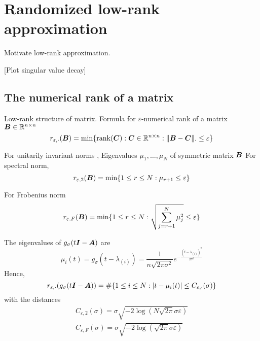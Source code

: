 \chapter{Randomized low-rank approximation}
\label{chp:3-nystrom}

Motivate low-rank approximation.

[Plot singular value decay]


\section{The numerical rank of a matrix}
\label{sec:3-nystrom-numerical-rank}

Low-rank structure of matrix.
Formula for $\varepsilon$-numerical rank \cite[Definition~1.1]{noga2013rank} of a matrix $\boldsymbol{B} \in \mathbb{R}^{n \times n}$
\begin{equation}
    r_{\varepsilon, \cdot}(\boldsymbol{B}) = \min \{\operatorname{rank}(\boldsymbol{C}): \boldsymbol{C} \in \mathbb{R}^{n \times n}: \lVert \boldsymbol{B} - \boldsymbol{C} \rVert _{\cdot} \leq \varepsilon \}
    \label{equ:3-nystrom-SS-def-numerical-low-rank}
\end{equation}

For unitarily invariant norms \cite[Theorem~5]{mirsky1960truncation},
Eigenvalues $\mu_1, \dots, \mu_N$ of symmetric matrix $\boldsymbol{B}$
For spectral norm,
\begin{equation}
    r_{\varepsilon, 2}(\boldsymbol{B}) = \min \{1 \leq r \leq N: \mu_{r+1} \leq \varepsilon \}
    \label{equ:3-nystrom-SS-def-numerical-low-rank-spectral-norm}
\end{equation}

For Frobenius norm
\begin{equation}
    r_{\varepsilon, F}(\boldsymbol{B}) = \min \{1 \leq r \leq N: \sqrt{\sum_{j=r+1}^N \mu_{j}^2} \leq \varepsilon \}
    \label{equ:3-nystrom-SS-def-numerical-low-rank-frobenius-norm}
\end{equation}

The eigenvalues of $g_{\sigma}(t\boldsymbol{I} - \boldsymbol{A})$ are
\begin{equation}
    \mu_i(t) = g_{\sigma}(t - \lambda_{(i)}) = \frac{1}{n \sqrt{2 \pi \sigma^2}} e^{-\frac{(t - \lambda_{(i)})^2}{2 \sigma^2}}
\end{equation}
Hence, 
\begin{equation}
    r_{\varepsilon, \cdot}(g_{\sigma}(t\boldsymbol{I} - \boldsymbol{A})) = \#\{1\leq i\leq N: |t - \mu_i(t)| \leq C_{\varepsilon, \cdot}(\sigma)\}
\end{equation}
with the distances
\begin{align}
    C_{\varepsilon, 2}(\sigma) = \sigma \sqrt{-2 \log(N \sqrt{2 \pi} \sigma \varepsilon)} \\
    C_{\varepsilon, F}(\sigma) = \sigma \sqrt{-2 \log(\sqrt{2 \pi} \sigma \varepsilon)}
\end{align}

